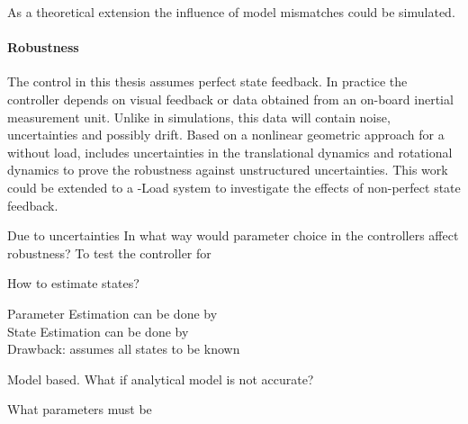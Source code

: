 As a theoretical extension the influence of model mismatches could be simulated.

\paragraph{Robustness}
The control in this thesis assumes perfect state feedback. In practice the controller depends on visual feedback or data obtained from an on-board inertial measurement unit. Unlike in simulations, this data will contain noise, uncertainties and possibly drift. 
Based on a nonlinear geometric approach for a  without load, \cite{Goodarzi2013a} includes uncertainties in the translational dynamics and rotational dynamics to prove the robustness against unstructured uncertainties. This work could be extended to a -Load system to investigate the effects of non-perfect state feedback. 

Due to uncertainties
In what way would parameter choice in the controllers affect robustness?
To test the controller for


How to estimate states?

Parameter Estimation can be done by\\

State Estimation can be done by\\

Drawback: assumes all states to be known

Model based. What if analytical model is not accurate?

What parameters must be 





